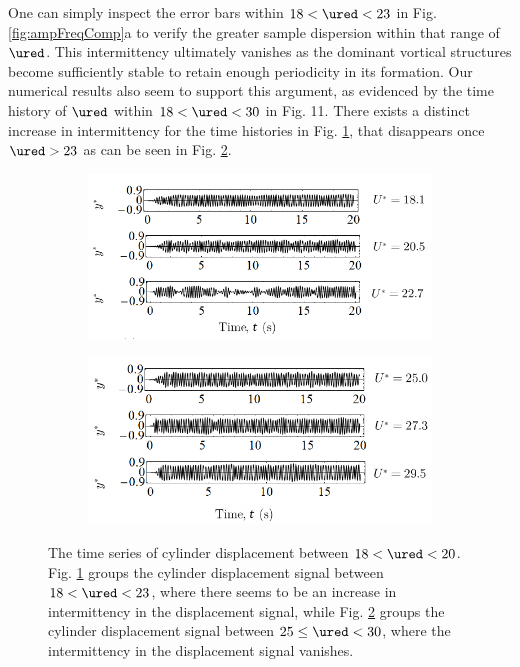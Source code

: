 \documentclass[a4paper,fleqn]{cas-sc}
\begin{document}
One can simply inspect the error bars within  $18 < \ured < 23$ in Fig. \ref{fig:ampFreqComp}a to verify the greater sample dispersion within that range of  $\ured$. This intermittency ultimately vanishes as the dominant vortical structures become sufficiently stable to retain enough periodicity in its formation. Our numerical results also seem to support this argument, as evidenced by the time history of  $\ured$ within $18 < \ured <30$ in Fig. 11. There exists a distinct increase in intermittency for the time histories in Fig. \ref{fig:unstableSVIV}, that disappears once  $\ured > 23$ as can be seen in Fig. \ref{fig:stableSVIV}.

\begin{figure}
  \centering
  \begin{subfigure}[h]{0.49\textwidth}
    \includegraphics[width=\textwidth]{figs/figure11a}
    \caption{}
    \label{fig:unstableSVIV}
  \end{subfigure}

  \begin{subfigure}[h]{0.49\textwidth}
    \includegraphics[width=\textwidth]{figs/figure11b}
    \caption{}
    \label{fig:stableSVIV}
  \end{subfigure}

  \caption{The time series of cylinder displacement between $18 < \ured < 20$. Fig. \ref{fig:unstableSVIV} groups the cylinder displacement signal between $18 < \ured < 23$, where there seems to be an increase in intermittency in the displacement signal, while Fig. \ref{fig:stableSVIV} groups the cylinder displacement signal between $25 \leq \ured < 30$, where the intermittency in the displacement signal vanishes.} \label{fig:cylDispSignal}
\end{figure}
\end{document}

